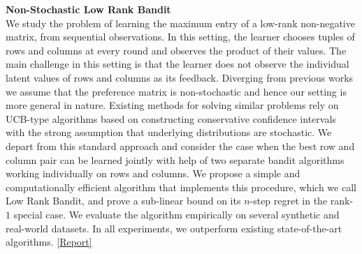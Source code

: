 \documentclass[margin,11pt]{res}
\begin{document}
\begin{resume}
%

\textbf{Non-Stochastic Low Rank Bandit}\\
We study the problem of learning the maximum entry of a low-rank non-negative matrix, from sequential observations. In this setting, the learner chooses tuples of rows and columns at every round and observes the product of their values. The main challenge in this setting is that the learner does not observe the individual latent values of rows and columns as its feedback. Diverging from previous works we assume that the preference matrix is non-stochastic and hence our setting is more general in nature. Existing methods for solving similar problems rely on UCB-type algorithms based on constructing conservative confidence intervals with the strong assumption that underlying distributions are stochastic. We depart from this standard approach and consider the case when the best row and column pair can be learned jointly with help of two separate bandit algorithms working individually on rows and columns. We propose a simple and computationally efficient algorithm that implements this procedure, which we call Low Rank Bandit, and prove a sub-linear bound on its $n$-step regret in the rank-$1$ special case. We evaluate the algorithm empirically on several synthetic and real-world datasets. In all experiments, we outperform existing state-of-the-art algorithms. \href{https://github.com/Subhojyoti/Latent_Bandits/blob/master/IJCAI2019/bandit_paper.pdf}{[Report]}



\end{resume}
\end{document}
